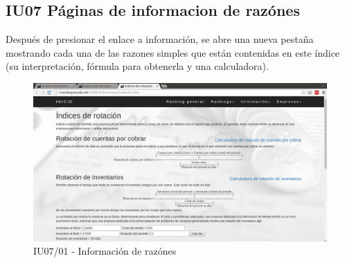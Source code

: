 \hypertarget{IU07}{\subsection{IU07 Páginas de informacion de razónes}}

    Después de presionar el enlace a información, se abre una nueva pestaña
    mostrando cada una de las razones simples que están contenidas en este índice
    (su interpretación, fórmula para obtenerla y una calculadora).

    \begin{figure}[H]
        \begin{center}
            \includegraphics[scale=0.3]{pantallas/Info1}
            \caption{IU07/01 - Información de razónes}
        \end{center}
    \end{figure}
